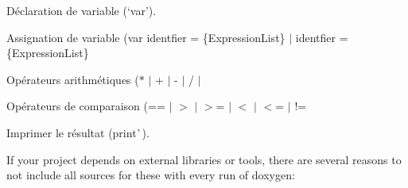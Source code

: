 
\begin{DoxyItemize}
\item Déclaration de variable (`\textquotesingle{}var'{\ttfamily ).}
\item {\ttfamily Assignation de variable (}\textquotesingle{}var identfier = \{Expression\+List\}\textquotesingle{} $\vert$ \textquotesingle{}identfier = \{Expression\+List\}
\item {\ttfamily Opérateurs arithmétiques (}\textquotesingle{}$\ast$\textquotesingle{} $\vert$ \textquotesingle{}+\textquotesingle{} $\vert$ \textquotesingle{}-\/\textquotesingle{} $\vert$ \textquotesingle{}/\textquotesingle{} $\vert$ \textquotesingle{}
\item {\ttfamily Opérateurs de comparaison (}\textquotesingle{}==\textquotesingle{} $\vert$ \textquotesingle{}\texorpdfstring{$>$}{>}\textquotesingle{} $\vert$ \textquotesingle{}\texorpdfstring{$>$}{>}=\textquotesingle{} $\vert$ \textquotesingle{}\texorpdfstring{$<$}{<}\textquotesingle{} $\vert$ \textquotesingle{}\texorpdfstring{$<$}{<}=\textquotesingle{} $\vert$ \textquotesingle{}!=
\item {\ttfamily Imprimer le résultat (}\textquotesingle{}print\textquotesingle{}\`{}).
\end{DoxyItemize}



If your project depends on external libraries or tools, there are several reasons to not include all sources for these with every run of doxygen\+:



